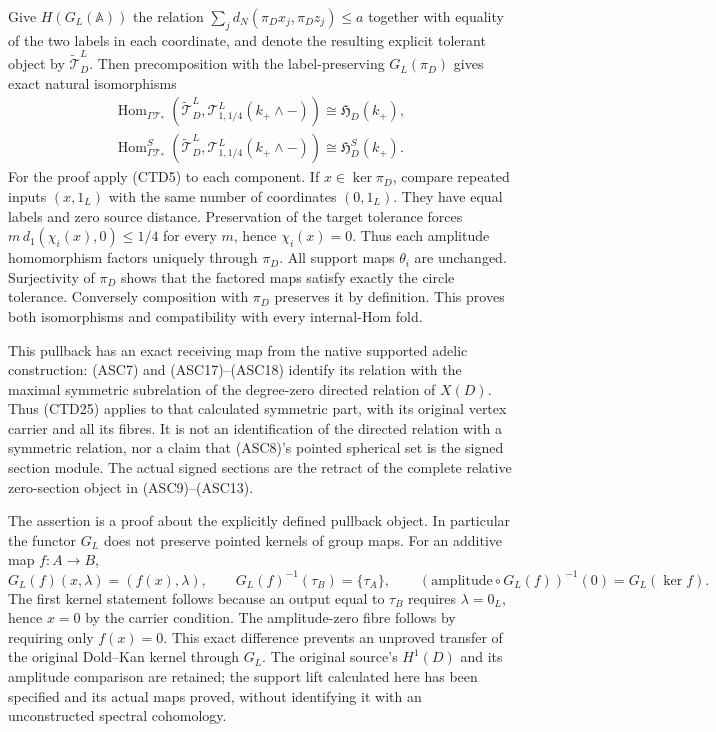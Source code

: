 Give $H(G_L(\mathbb A))$ the relation
$\sum_jd_N(\pi_Dx_j,\pi_Dz_j)\le a$ together with
equality of the two labels in each coordinate,
and denote the resulting explicit tolerant object by
$\widetilde{\mathcal T}_D^L$. Then precomposition with the
label-preserving $G_L(\pi_D)$ gives exact natural isomorphisms
\begin{equation}\tag{CTD25}
\begin{gathered}
\operatorname{Hom}_{\Gamma\mathcal T_*}
(\widetilde{\mathcal T}_D^L,\mathcal T^L_{1,1/4}(k_+\wedge-))
\cong\mathfrak H_D(k_+),\\
\operatorname{Hom}^{S}_{\Gamma\mathcal T_*}
(\widetilde{\mathcal T}_D^L,\mathcal T^L_{1,1/4}(k_+\wedge-))
\cong\mathfrak H_D^S(k_+).
\end{gathered}
\end{equation}
For the proof apply (CTD5) to each component.
If $x\in\ker\pi_D$, compare repeated inputs $(x,1_L)$ with
the same number of coordinates $(0,1_L)$. They have equal
labels and zero source distance. Preservation of the target tolerance
forces $m\,d_1(\chi_i(x),0)\le1/4$ for every $m$, hence
$\chi_i(x)=0$. Thus each amplitude homomorphism factors uniquely
through $\pi_D$. All support maps $\theta_i$ are unchanged.
Surjectivity of $\pi_D$ shows that the factored maps satisfy
exactly the circle tolerance. Conversely composition with
$\pi_D$ preserves it by definition. This proves both
isomorphisms and compatibility with every internal-Hom fold.

This pullback has an exact receiving map from the native supported
adelic construction: (ASC7) and (ASC17)--(ASC18) identify its relation
with the maximal symmetric subrelation of the degree-zero directed
relation of $X(D)$. Thus (CTD25) applies to that calculated symmetric
part, with its original vertex carrier and all its fibres. It is not
an identification of the directed relation with a symmetric relation,
nor a claim that (ASC8)'s pointed spherical set is the signed section
module. The actual signed sections are the retract of the complete
relative zero-section object in (ASC9)--(ASC13).

The assertion is a proof about the explicitly defined pullback
object. In particular the functor $G_L$ does not preserve
pointed kernels of group maps. For an additive map $f:A\to B$,
\begin{equation}\tag{CTD26}
G_L(f)(x,\lambda)=(f(x),\lambda),\qquad
G_L(f)^{-1}(\tau_B)=\{\tau_A\},\qquad
(\mathrm{amplitude}\circ G_L(f))^{-1}(0)=G_L(\ker f).
\end{equation}
The first kernel statement follows because an output equal to
$\tau_B$ requires $\lambda=0_L$, hence $x=0$ by the carrier
condition. The amplitude-zero fibre follows by requiring only
$f(x)=0$. This exact difference prevents an unproved transfer
of the original Dold--Kan kernel through $G_L$.
The original source's $H^1(D)$ and its amplitude comparison are
retained; the support lift calculated here has been specified
and its actual maps proved, without identifying it with an
unconstructed spectral cohomology.

